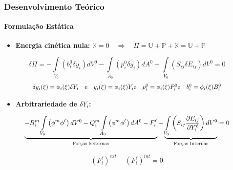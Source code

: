 \documentclass{beamer}
\begin{document}
\begin{frame}
    \frametitle{Desenvolvimento Teórico}
        \framesubtitle{Formulação Estática} 

        \begin{itemize}
            \item \textbf{Energia cinética nula:} \( \mathbb{K}=0 \quad \Rightarrow \quad \varPi = \mathbb{U} + \mathbb{P} + \mathbb{K} = \mathbb{U} + \mathbb{P} \) 
        \end{itemize}

        \begin{equation}
            \delta \varPi = -\int\limits_{V_0} \left(b^0_i \delta y_i \right) dV^0 - \int\limits_{A_0} \left(p^0_i \delta y_i \right) dA^0 + \int\limits_{V_0} \left(S_{ij} \delta E_{ij} \right) dV^0 = 0
        \end{equation}
        \begin{equation}
            \scalebox{0.9}{$
            \delta y_i(\xi) = \phi_i(\xi) \delta Y_i \quad \text{e} \quad y_i(\xi) = \phi_i(\xi) Y_i \text{e} \quad p^0_i = \phi_i(\xi) P_i^0 \text{e} \quad b^0_i = \phi_i(\xi) B_i^0
            $}
        \end{equation}

        \begin{itemize}
            \item \textbf{Arbitrariedade de \(\delta Y_i\):}
        \end{itemize}

        \begin{equation}
            \scalebox{0.95}{$
            \underbrace{-B^m_i\int\limits_{V_0} \left(\phi^m \phi^\ell \right) dV^0 - Q^m_i\int\limits_{A_0} \left(\phi^m \phi^\ell \right) dA^0 - F^\ell_i}_{\text{Forças Externas}}  +\underbrace{\int\limits_{V_0} \left(S_{ij} \frac{\partial E_{ij}}{\partial Y^\ell_i} \right) dV^0}_{\text{Forças Internas}}  = 0
            $}
        \end{equation}

        \begin{equation}
            (F^{\ell}_i)^{ext} - (F^{\ell}_i)^{int} = 0 
        \end{equation}

\end{frame}
\end{document}
